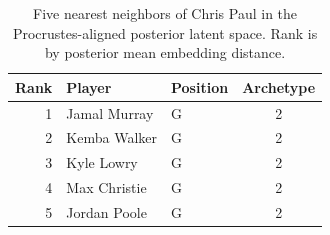 \begin{table}[htbp]
  \centering\small
  \begin{tabular}{rllc}
    \toprule
    Rank & Player & Position & Archetype \\
    \midrule
    1 & Jamal Murray & G & 2 \\
    2 & Kemba Walker & G & 2 \\
    3 & Kyle Lowry & G & 2 \\
    4 & Max Christie & G & 2 \\
    5 & Jordan Poole & G & 2 \\
    \bottomrule
  \end{tabular}
  \caption{Five nearest neighbors of Chris Paul in the Procrustes-aligned posterior latent space. Rank is by posterior mean embedding distance.}
  \label{tab:Chris_Paul_neighbors}
\end{table}

